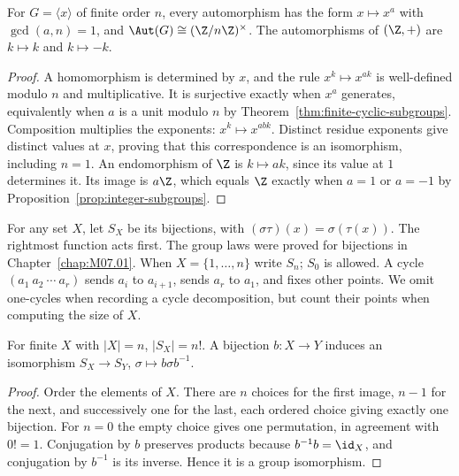 \begin{proposition}\label{prop:cyclic-automorphisms}
For $G=\langle x\rangle$ of finite order $n$, every automorphism has the form $x\mapsto x^a$ with $\gcd(a,n)=1$, and
$\Aut(G)\cong(\Z/n\Z)^\times$. The automorphisms of $(\Z,+)$ are $k\mapsto k$ and $k\mapsto-k$.
\end{proposition}
\begin{proof}
A homomorphism is determined by $x$, and the rule $x^k\mapsto x^{ak}$ is well-defined modulo $n$ and multiplicative. It is surjective exactly when $x^a$ generates, equivalently when $a$ is a unit modulo $n$ by Theorem~\ref{thm:finite-cyclic-subgroups}. Composition multiplies the exponents: $x^k\mapsto x^{abk}$. Distinct residue exponents give distinct values at $x$, proving that this correspondence is an isomorphism, including $n=1$. An endomorphism of $\Z$ is $k\mapsto ak$, since its value at $1$ determines it. Its image is $a\Z$, which equals $\Z$ exactly when $a=1$ or $a=-1$ by Proposition~\ref{prop:integer-subgroups}.
\end{proof}

For any set $X$, let $S_X$ be its bijections, with
$(\sigma\tau)(x)=\sigma(\tau(x))$. The rightmost function acts first. The group laws were proved for bijections in Chapter~\ref{chap:M07.01}. When $X=\{1,\ldots,n\}$ write $S_n$; $S_0$ is allowed. A cycle $(a_1\ a_2\ \cdots\ a_r)$ sends $a_i$ to $a_{i+1}$, sends $a_r$ to $a_1$, and fixes other points. We omit one-cycles when recording a cycle decomposition, but count their points when computing the size of $X$.

\begin{proposition}\label{prop:symmetric-order}
For finite $X$ with $|X|=n$, $|S_X|=n!$. A bijection $b:X\to Y$ induces an isomorphism $S_X\to S_Y$, $\sigma\mapsto b\sigma b^{-1}$.
\end{proposition}
\begin{proof}
Order the elements of $X$. There are $n$ choices for the first image, $n-1$ for the next, and successively one for the last, each ordered choice giving exactly one bijection. For $n=0$ the empty choice gives one permutation, in agreement with $0!=1$. Conjugation by $b$ preserves products because $b^{-1}b=\id_X$, and conjugation by $b^{-1}$ is its inverse. Hence it is a group isomorphism.
\end{proof}

